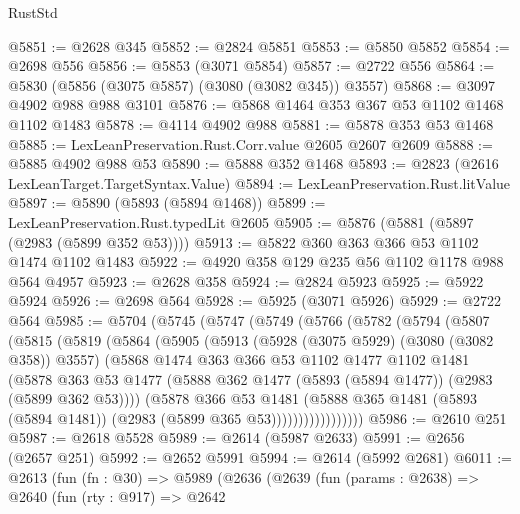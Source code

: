 \begin{lexlean}{RustStd}
\begin{coremodule}
@5851 := @2628 @345
@5852 := @2824 @5851
@5853 := @5850 @5852
@5854 := @2698 @556
@5856 := @5853 (@3071 @5854)
@5857 := @2722 @556
@5864 := @5830 (@5856 (@3075 @5857) (@3080 (@3082 @345)) @3557)
@5868 := @3097 @4902 @988 @988 @3101
@5876 := @5868 @1464 @353 @367 @53 @1102 @1468 @1102 @1483
@5878 := @4114 @4902 @988
@5881 := @5878 @353 @53 @1468
@5885 := LexLeanPreservation.Rust.Corr.value @2605 @2607 @2609
@5888 := @5885 @4902 @988 @53
@5890 := @5888 @352 @1468
@5893 := @2823 (@2616 LexLeanTarget.TargetSyntax.Value)
@5894 := LexLeanPreservation.Rust.litValue
@5897 := @5890 (@5893 (@5894 @1468))
@5899 := LexLeanPreservation.Rust.typedLit @2605
@5905 := @5876 (@5881 (@5897 (@2983 (@5899 @352 @53))))
@5913 := @5822 @360 @363 @366 @53 @1102 @1474 @1102 @1483
@5922 := @4920 @358 @129 @235 @56 @1102 @1178 @988 @564 @4957
@5923 := @2628 @358
@5924 := @2824 @5923
@5925 := @5922 @5924
@5926 := @2698 @564
@5928 := @5925 (@3071 @5926)
@5929 := @2722 @564
@5985 := @5704
    (@5745
      (@5747
        (@5749
          (@5766
            (@5782
              (@5794
                (@5807
                  (@5815
                    (@5819
                      (@5864
                        (@5905
                          (@5913
                            (@5928 (@3075 @5929) (@3080 (@3082 @358)) @3557)
                            (@5868
                              @1474
                              @363
                              @366
                              @53
                              @1102
                              @1477
                              @1102
                              @1481
                              (@5878
                                @363
                                @53
                                @1477
                                (@5888 @362 @1477 (@5893 (@5894 @1477)) (@2983 (@5899 @362 @53))))
                              (@5878
                                @366
                                @53
                                @1481
                                (@5888
                                  @365
                                  @1481
                                  (@5893 (@5894 @1481))
                                  (@2983 (@5899 @365 @53)))))))))))))))))
@5986 := @2610 @251
@5987 := @2618 @5528
@5989 := @2614 (@5987 @2633)
@5991 := @2656 (@2657 @251)
@5992 := @2652 @5991
@5994 := @2614 (@5992 @2681)
@6011 := @2613
    (fun (fn : @30) =>
    @5989
      (@2636
        (@2639
          (fun (params : @2638) =>
          @2640
            (fun (rty : @917) =>
            @2642

\end{coremodule}
\end{lexlean}
